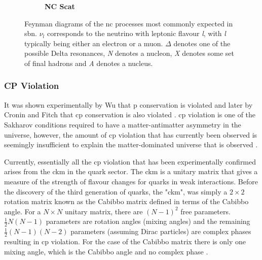 \begin{figure}[h!]
\begin{subfigure}{0.3\linewidth}
\centering \textbf{NC \electron Scat} \\ \vspace{0.3cm}
\end{subfigure}
\caption[Feynman diagrams of the \gls{nc} processes most commonly expected in \gls{sbn}.]{Feynman diagrams of the \gls{nc} processes most commonly expected in \gls{sbn}. $\nu_l$ corresponds to the neutrino with leptonic flavour \textit{l}, with \textit{l} typically being either an electron or a muon. $\Delta$ denotes one of the possible Delta resonances, \textit{N} denotes a nucleon, \textit{X} denotes some set of final hadrons and \textit{A} denotes a nucleus.}
\label{fig:NC_Feynman_diagrams}
\end{figure}

\subsubsection{CP Violation}\label{subsubsec:CP_violation}

It was shown experimentally by Wu that \gls{p} conservation is violated and later by Cronin and Fitch that \gls{cp} conservation is also violated \cite{Wu_experiment}\cite{Cronin_and_Fitch_experiment}. \gls{cp} violation is one of the Sakharov conditions required to have a matter-antimatter asymmetry in the universe, however, the amount of \gls{cp} violation that has currently been observed is seemingly insufficient to explain the matter-dominated universe that is observed \cite{Sakharov_conditions}.

Currently, essentially all the \gls{cp} violation that has been experimentally confirmed arises from the \gls{ckm} in the quark sector. The \gls{ckm} is a unitary matrix that gives a measure of the strength of flavour changes for quarks in weak interactions. Before the discovery of the third generation of quarks, the "\gls{ckm}", was simply a $2 \times 2$ rotation matrix known as the Cabibbo matrix defined in terms of the Cabibbo angle. For a $N \times N$ unitary matrix, there are $(N-1)^2$ free parameters. $\frac{1}{2}N(N-1)$ parameters are rotation angles (mixing angles) and the remaining $\frac{1}{2}(N-1)(N-2)$ parameters (assuming Dirac particles) are complex phases resulting in \gls{cp} violation. For the case of the Cabibbo matrix there is only one mixing angle, which is the Cabibbo angle and no complex phase \cite{Fundamentals_of_Neutrino_Physics_and_Astrophysics} \cite{leptonic_cp_violation}. 

